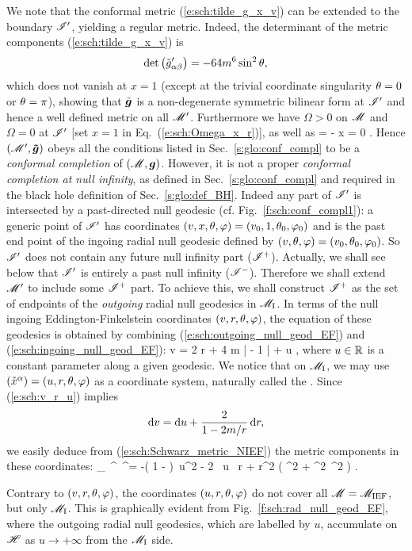 We note that the conformal metric (\ref{e:sch:tilde_g_x_v}) can be extended
to the boundary $\mathscr{I}'$, yielding a regular metric. Indeed, the determinant of
the metric components (\ref{e:sch:tilde_g_x_v}) is
\[
    \det\left({\tilde{g}'}_{\alpha\beta}\right) = - 64 m^6 \sin^2\theta ,
\]
which does not vanish at $x=1$ (except at the trivial coordinate singularity
$\theta=0$ or $\theta=\pi$), showing that $\tilde{\bm{g}}$ is a non-degenerate
symmetric bilinear form at $\mathscr{I}'$ and hence a well defined metric on all
$\mathscr{M}'$.
Furthermore
we have $\Omega >0$ on $\mathscr{M}$ and $\Omega=0$ at $\mathscr{I}'$ [set $x=1$ in Eq.~(\ref{e:sch:Omega_x_r})], as well as
\be
    \dd \Omega = - \dd x \not = 0 .
\ee
Hence $(\mathscr{M}',\bm{\tilde{g}})$ obeys all the conditions
listed in Sec.~\ref{s:glo:conf_compl} to be a \emph{conformal completion}
of $(\mathscr{M},\bm{g})$.
However, it is not a proper \emph{conformal completion at null infinity},
as defined in Sec.~\ref{s:glo:conf_compl} and required in the black hole
definition of Sec.~\ref{s:glo:def_BH}. Indeed any part of $\mathscr{I}'$ is intersected by
a past-directed null geodesic (cf. Fig.~\ref{f:sch:conf_compl1}): a generic point of $\mathscr{I}'$ has coordinates
$(v,x,\theta,\varphi) = (v_0,1,\theta_0,\varphi_0)$ and is the past end point of the
ingoing radial null geodesic defined by
$(v,\theta,\varphi) = (v_0,\theta_0,\varphi_0)$.
So $\mathscr{I}'$ does not contain any future null infinity part ($\mathscr{I}^+$). Actually,
we shall see below that $\mathscr{I}'$ is entirely a past null infinity ($\mathscr{I}^-$).
Therefore we shall extend $\mathscr{M}'$ to include some $\mathscr{I}^+$ part.
To achieve this, we shall construct $\mathscr{I}^+$ as the set of endpoints of the
\emph{outgoing} radial null geodesics in $\mathscr{M}_{\rm I}$. In terms of
the null ingoing Eddington-Finkelstein coordinates $(v,r,\theta,\varphi)$,
the equation of these geodesics is obtained by combining (\ref{e:sch:outgoing_null_geod_EF}) and (\ref{e:sch:ingoing_null_geod_EF}):
\be \label{e:sch:v_r_u}
    v = 2 r + 4 m \ln \left|  - 1 \right| + u ,
\ee
where $u\in\mathbb{R}$ is a constant parameter along a given geodesic.
We notice that on $\mathscr{M}_{\rm I}$, we may use $(\check{x}^\alpha) = (u,r,\theta,\varphi)$ as a coordinate
system, naturally called the . Since (\ref{e:sch:v_r_u}) implies
\[
    \mathrm{d} v = \mathrm{d} u + \frac{2}{1-2m/r}\, \mathrm{d} r,
\]
we easily deduce from (\ref{e:sch:Schwarz_metric_NIEF}) the metric components
in these coordinates:
\be \label{e:sch:g_u_r}
        {}_{\mu\nu}\, ^\mu \, ^\nu =
            -\left( 1 -  \right)\, \D u^2
            - 2 \, \D u \, \D r
        + r^2 \left( \D\th^2 + \sin^2\th\, \D\ph^2 \right) .
\ee
\begin{remark}
Contrary to $(v,r,\theta,\varphi)$, the coordinates $(u,r,\theta,\varphi)$ do not cover
all $\mathscr{M} = \mathscr{M}_{\rm IEF}$, but only $\mathscr{M}_{\rm I}$. This is graphically
evident from
Fig.~\ref{f:sch:rad_null_geod_EF}, where the outgoing radial null geodesics,
which are labelled by $u$, accumulate on $\mathscr{H}$ as $u\rightarrow +\infty$
from the $\mathscr{M}_{\rm I}$ side.
\end{remark}


